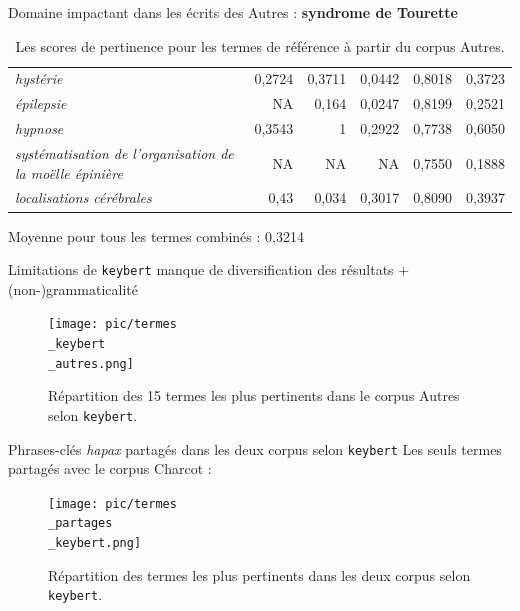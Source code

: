 \begin{frame}{Domaine impactant dans les écrits des Autres : \textbf{syndrome de Tourette}}
\begin{table}[h]
{\begin{tabular}{|l|r|r|r|r|r|}
				\textit{hystérie} & 0,2724 & 0,3711 & 0,0442 & 0,8018 & 0,3723 \\
				\textit{épilepsie} & NA & 0,164 & 0,0247 & 0,8199 & 0,2521 \\
				\textit{hypnose} & 0,3543 & 1 & 0,2922 & 0,7738 & 0,6050 \\
				\textit{systématisation de l'organisation de la moëlle épinière} & NA & NA & NA & 0,7550 & 0,1888 \\
				\textit{localisations cérébrales} & 0,43 & 0,034 & 0,3017 & 0,8090 & 0,3937 \\
				\hline
			\end{tabular}
		}
		\caption{Les scores de pertinence pour les termes de référence à partir du corpus \og{}Autres\fg{}.}
	\end{table}
	{\small Moyenne pour tous les termes combinés : 0,3214}
\end{frame}

\begin{frame}{Limitations de \texttt{keybert}}
	\danger{} manque de diversification des résultats + (non-)grammaticalité\\
	\begin{figure}[!ht]
		\centering
		\texttt{[image: pic/termes\\\_keybert\\\_autres.png]}
		\caption{Répartition des 15 termes les plus pertinents dans le corpus \og{}Autres\fg{} selon \texttt{keybert}.}
		\label{fig:enter-label}
	\end{figure}
\end{frame}

\begin{frame}{Phrases-clés \textit{hapax} partagés dans les deux corpus selon \texttt{keybert}}
	Les seuls termes partagés avec le corpus Charcot : 
	\begin{figure}[!ht]
		\centering
		\texttt{[image: pic/termes\\\_partages\\\_keybert.png]}
		\caption{Répartition des termes les plus pertinents dans les deux corpus selon \texttt{keybert}.}
		\label{fig:enter-label}
	\end{figure}
\end{frame}


